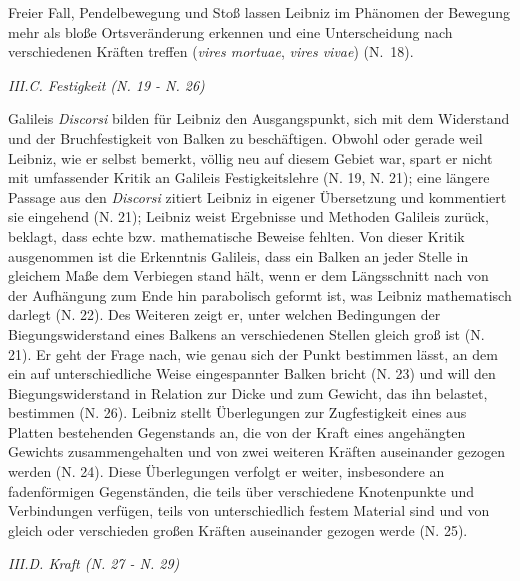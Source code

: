 Freier Fall, Pendelbewegung und Sto{\ss} lassen Leibniz im Phänomen der Bewegung mehr als bloße Ortsveränderung erkennen und eine Unterscheidung nach verschiedenen Kräften treffen (\textit{vires mortuae}, \textit{vires vivae}) (N.~18).
\par\vspace{2.0ex}
\noindent
\textit{III.C. Festigkeit (N. 19 - N. 26)}
\par\noindent
Galileis \textit{Discorsi} bilden für Leibniz den Ausgangspunkt, sich mit dem Widerstand und der Bruchfestigkeit von Balken zu beschäftigen. Obwohl oder gerade weil Leibniz, wie er selbst bemerkt, völlig neu auf diesem Gebiet war, spart er nicht mit umfassender Kritik an Galileis Festigkeitslehre (N. 19, N. 21); eine längere Passage aus den \textit{Discorsi} zitiert Leibniz in eigener Übersetzung und kommentiert sie eingehend (N. 21); Leibniz weist Ergebnisse und Methoden Galileis zurück, beklagt, dass echte bzw. mathematische Beweise fehlten. Von dieser Kritik ausgenommen ist die Erkenntnis Galileis, dass ein Balken an jeder Stelle in gleichem Ma{\ss}e dem Verbiegen stand hält, wenn er dem Längsschnitt nach von der Aufhängung zum Ende hin parabolisch geformt ist, was Leibniz mathematisch darlegt (N. 22). Des Weiteren zeigt er, unter welchen Bedingungen der Biegungswiderstand eines Balkens an verschiedenen Stellen gleich gro{\ss} ist (N. 21). Er geht der Frage nach, wie genau sich der Punkt bestimmen lässt, an dem ein auf unterschiedliche Weise eingespannter Balken bricht (N. 23) und will den Biegungswiderstand in Relation zur Dicke und zum Gewicht, das ihn belastet, bestimmen (N. 26). Leibniz stellt Überlegungen zur Zugfestigkeit eines aus Platten bestehenden Gegenstands an, die von der Kraft eines angehängten Gewichts zusammengehalten und von zwei weiteren Kräften auseinander gezogen werden (N. 24). Diese Überlegungen verfolgt er weiter, insbesondere an fadenförmigen Gegenständen, die teils über verschiedene Knotenpunkte und Verbindungen verfügen, teils von unterschiedlich festem Material sind und von gleich oder verschieden gro{\ss}en Kräften auseinander gezogen werde (N. 25). 
\par
\par\vspace{2.0ex}
\newpage
\noindent
\textit{III.D. Kraft (N. 27 - N. 29)}
\par\noindent
